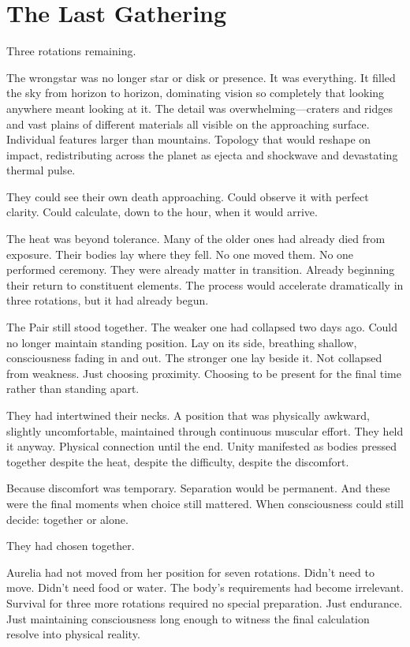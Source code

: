 \chapter{The Last Gathering}
\label{ch:14}


Three rotations remaining.

The wrongstar was no longer star or disk or presence. It was everything. It filled the sky from horizon to horizon, dominating vision so completely that looking anywhere meant looking at it. The detail was overwhelming—craters and ridges and vast plains of different materials all visible on the approaching surface. Individual features larger than mountains. Topology that would reshape on impact, redistributing across the planet as ejecta and shockwave and devastating thermal pulse.

They could see their own death approaching. Could observe it with perfect clarity. Could calculate, down to the hour, when it would arrive.

The heat was beyond tolerance. Many of the older ones had already died from exposure. Their bodies lay where they fell. No one moved them. No one performed ceremony. They were already matter in transition. Already beginning their return to constituent elements. The process would accelerate dramatically in three rotations, but it had already begun.

The Pair still stood together. The weaker one had collapsed two days ago. Could no longer maintain standing position. Lay on its side, breathing shallow, consciousness fading in and out. The stronger one lay beside it. Not collapsed from weakness. Just choosing proximity. Choosing to be present for the final time rather than standing apart.

They had intertwined their necks. A position that was physically awkward, slightly uncomfortable, maintained through continuous muscular effort. They held it anyway. Physical connection until the end. Unity manifested as bodies pressed together despite the heat, despite the difficulty, despite the discomfort.

Because discomfort was temporary. Separation would be permanent. And these were the final moments when choice still mattered. When consciousness could still decide: together or alone.

They had chosen together.

\scenebreak

Aurelia had not moved from her position for seven rotations. Didn't need to move. Didn't need food or water. The body's requirements had become irrelevant. Survival for three more rotations required no special preparation. Just endurance. Just maintaining consciousness long enough to witness the final calculation resolve into physical reality.

